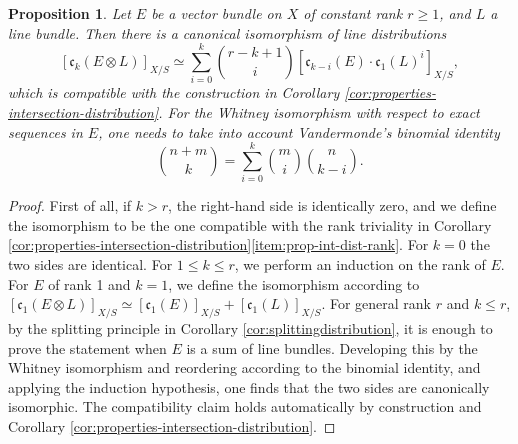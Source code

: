 \documentclass[JEP,XML,SOM,Unicode,published]{cedram}
\theoremstyle{plain}
\newtheorem{proposition}[theorem]{Proposition}
\theoremstyle{definition}
\newcommand{\cfrak}{\mathfrak c}
\begin{document}
\begin{proposition}\label{prop:Cherntensorproductwithline}
Let $E$ be a vector bundle on $X$ of constant rank $r\geq 1$, and $L$ a line bundle. Then there is a canonical isomorphism of line distributions
\begin{equation}\label{eq:ck-tensor-product}
[\cfrak_k(E \otimes L)]_{X/S} \simeq \sum_{i=0}^{k} \binom{r-k+1}{i} [\cfrak_{k-i}(E) \cdot \cfrak_1(L)^{i}]_{X/S},
\end{equation}
which is compatible with the construction in Corollary \ref{cor:properties-intersection-distribution}. For the Whitney isomorphism with respect to exact sequences in $E$, one needs to take into account Vandermonde's binomial identity
\begin{displaymath}
\binom{n + m}{k} = \sum_{i=0}^k \binom{m}{i}\binom{n}{k-i}.
\end{displaymath}
\end{proposition}
\begin{proof}
First of all, if $k > r$, the right-hand side is identically zero, and we define the isomorphism to be the one compatible with the rank triviality in Corollary \ref{cor:properties-intersection-distribution}\eqref{item:prop-int-dist-rank}. For $k=0$ the two sides are identical. For $1\leq k\leq r$, we perform an induction on the rank of $E$. For $E$ of rank 1 and $k=1$, we define the isomorphism according to $[\cfrak_{1}(E\otimes L)]_{X/S}\simeq [\cfrak_{1}(E)]_{X/S} + [\cfrak_{1}(L)]_{X/S}$. For general rank $r$ and $k\leq r$, by the splitting principle in Corollary \ref{cor:splittingdistribution}, it is enough to prove the statement when $E$ is a sum of line bundles. Developing this by the Whitney isomorphism and reordering according to the binomial identity, and applying the induction hypothesis, one finds that the two sides are canonically isomorphic. The compatibility claim holds automatically by construction and Corollary \ref{cor:properties-intersection-distribution}.
\end{proof}
\end{document}
